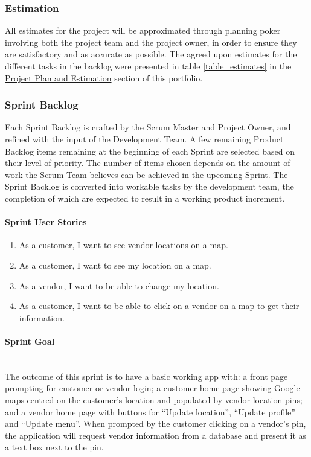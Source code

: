 \subsubsection{Estimation}
All estimates for the project will be approximated through planning poker involving both the project team and the project owner, in order to ensure they are satisfactory and as accurate as possible. The agreed upon estimates for the different tasks in the backlog were presented in table \ref{table_estimates} in the \hyperref[project plan and estimation]{Project Plan and Estimation} section of this portfolio.
\subsubsection{Sprint Backlog}
Each Sprint Backlog is crafted by the Scrum Master and Project Owner, and refined with the input of the Development Team. A few remaining Product Backlog items remaining at the beginning of each Sprint are selected based on their level of priority. The number of items chosen depends on the amount of work the Scrum Team believes can be achieved in the upcoming Sprint. The Sprint Backlog is converted into workable tasks by the development team, the completion of which are expected to result in a working product increment.
\paragraph{Sprint User Stories}
\begin{enumerate}
  \item As a customer, I want to see vendor locations on a map.
  \item As a customer, I want to see my location on a map.
  \item As a vendor, I want to be able to change my location.
  \item As a customer, I want to be able to click on a vendor on a map to get their information.
\end{enumerate}

\paragraph{Sprint Goal}\mbox{} \\
The outcome of this sprint is to have a basic working app with: a front page prompting for customer or vendor login; a customer home page showing Google maps centred on the customer’s location and populated by vendor location pins; and a vendor home page with buttons for “Update location”, “Update profile” and “Update menu”. When prompted by the customer clicking on a vendor’s pin, the application will request vendor information from a database and present it as a text box next to the pin.

